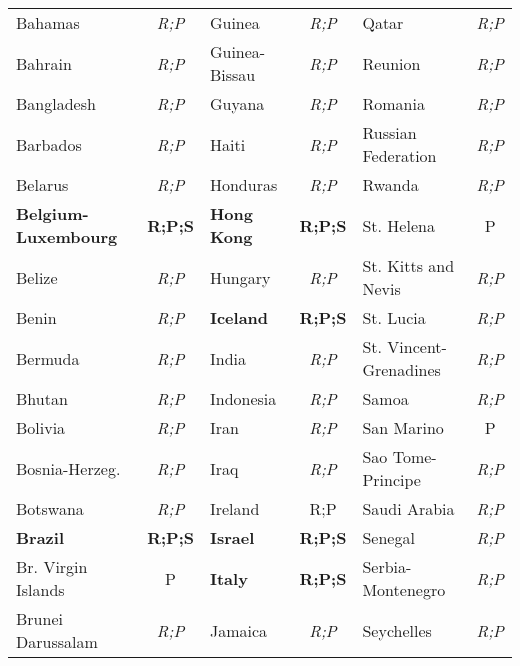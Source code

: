 \documentclass[12pt,twoside,a4paper,notitlepage]{article}
\begin{document}
\begin{table}
\begin{tabular}{|l|c|l|c|l|c|}
   Bahamas &  {\it R;P} &     Guinea &  {\it R;P} &      Qatar &  {\it R;P} \\

   Bahrain &  {\it R;P} & Guinea-Bissau &  {\it R;P} &    Reunion &  {\it R;P} \\

Bangladesh &  {\it R;P} &     Guyana &  {\it R;P} &    Romania &  {\it R;P} \\

  Barbados &  {\it R;P} &      Haiti &  {\it R;P} & Russian Federation &  {\it R;P} \\

   Belarus &  {\it R;P} &   Honduras &  {\it R;P} &     Rwanda &  {\it R;P} \\

  \bf Belgium-Luxembourg &  {\bf R;P;S} & \bf Hong Kong &  {\bf R;P;S} & St.
Helena &          P \\

    Belize &  {\it R;P} &    Hungary &  {\it R;P} & St.
Kitts and Nevis &  {\it R;P} \\

     Benin &  {\it R;P} &  \bf Iceland &  {\bf R;P;S} &  St.
Lucia &  {\it R;P} \\

   Bermuda &  {\it R;P} &      India &  {\it R;P} & St.
Vincent-Grenadines &  {\it R;P} \\

    Bhutan &  {\it R;P} &  Indonesia &  {\it R;P} &      Samoa &  {\it R;P} \\

   Bolivia &  {\it R;P} &       Iran &  {\it R;P} & San Marino &          P \\

Bosnia-Herzeg.
&  {\it R;P} &       Iraq &  {\it R;P} & Sao Tome-Principe &  {\it R;P} \\

  Botswana &  {\it R;P} &   Ireland &  {R;P} & Saudi Arabia &  {\it R;P} \\

  \bf Brazil &  {\bf R;P;S} &  \bf Israel &  {\bf R;P;S} &    Senegal &  {\it R;P} \\

Br.
Virgin Islands &          P &   \bf Italy &  {\bf R;P;S} & Serbia-Montenegro &  {\it R;P} \\

Brunei Darussalam &  {\it R;P} &    Jamaica &  {\it R;P} & Seychelles &  {\it R;P} \\


\end{tabular}
\end{table}
\end{document}
